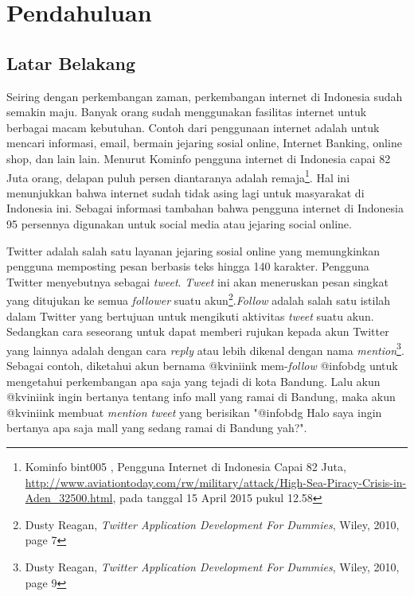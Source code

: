 \chapter{Pendahuluan}
\label{chap:pendahuluan}

\section{Latar Belakang}
\label{sec:latar belakang}

Seiring dengan perkembangan zaman, perkembangan internet di Indonesia sudah semakin maju.  Banyak orang sudah menggunakan fasilitas internet untuk berbagai macam kebutuhan. Contoh dari penggunaan internet adalah untuk mencari informasi, email, bermain jejaring sosial online, Internet Banking, online shop, dan lain lain. Menurut Kominfo pengguna internet di Indonesia capai 82 Juta orang, delapan puluh persen diantaranya adalah remaja\footnote{Kominfo bint005 , Pengguna Internet di Indonesia Capai 82 Juta, \url{http://www.aviationtoday.com/rw/military/attack/High-Sea-Piracy-Crisis-in-Aden_32500.html}, pada tanggal 15 April 2015 pukul 12.58}. Hal ini menunjukkan bahwa internet sudah tidak asing lagi untuk masyarakat di Indonesia ini. Sebagai informasi tambahan bahwa pengguna internet di Indonesia 95 persennya digunakan untuk social media atau jejaring social online.

Twitter adalah salah satu layanan jejaring sosial online yang memungkinkan pengguna memposting pesan berbasis teks hingga 140 karakter. Pengguna Twitter menyebutnya sebagai \textit{tweet}. \textit{Tweet} ini akan meneruskan pesan singkat yang ditujukan ke semua \textit{follower} suatu akun\footnote{Dusty Reagan, \textit{Twitter Application Development For Dummies}, Wiley, 2010, page 7}.\textit{Follow} adalah salah satu istilah dalam Twitter yang bertujuan untuk mengikuti aktivitas \textit{tweet} suatu akun. Sedangkan cara seseorang untuk dapat memberi rujukan kepada akun Twitter yang lainnya adalah dengan cara \textit{reply} atau lebih dikenal dengan nama \textit{mention}\footnote{Dusty Reagan, \textit{Twitter Application Development For Dummies}, Wiley, 2010, page 9}. Sebagai contoh, diketahui akun bernama @kviniink mem-\textit{follow} @infobdg untuk mengetahui perkembangan apa saja yang tejadi di kota Bandung. Lalu akun @kviniink ingin bertanya tentang info mall yang ramai di Bandung, maka akun @kviniink membuat \textit{mention tweet} yang berisikan "@infobdg Halo saya ingin bertanya apa saja mall yang sedang ramai di Bandung yah?".


